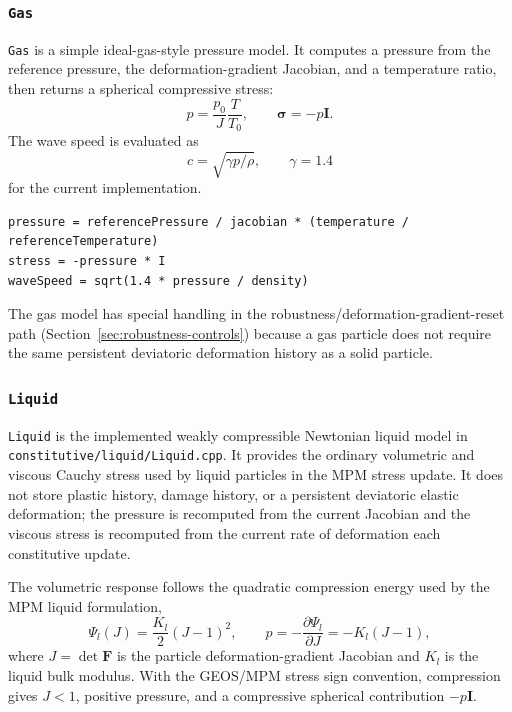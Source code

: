 \subsubsection{\texttt{Gas}}
\label{subsubsec:gas-model}

\texttt{Gas} is a simple ideal-gas-style pressure model.  It computes a pressure from the reference pressure, the deformation-gradient Jacobian, and a temperature ratio, then returns a spherical compressive stress:
\begin{equation}
  p = \frac{p_0}{J}\frac{T}{T_0},
  \qquad
  \boldsymbol{\sigma}=-p\mathbf{I}.
  \label{eq:gas-pressure}
\end{equation}
The wave speed is evaluated as
\begin{equation}
  c = \sqrt{\gamma p/\rho},
  \qquad \gamma=1.4
  \label{eq:gas-wavespeed}
\end{equation}
for the current implementation.

\begin{lstlisting}[caption={Gas stress update.},label={alg:gas-update},basicstyle=\ttfamily\small]
pressure = referencePressure / jacobian * (temperature / referenceTemperature)
stress = -pressure * I
waveSpeed = sqrt(1.4 * pressure / density)
\end{lstlisting}

The gas model has special handling in the robustness/deformation-gradient-reset path (Section~\ref{sec:robustness-controls}) because a gas particle does not require the same persistent deviatoric deformation history as a solid particle.

\subsubsection{\texttt{Liquid}}
\label{subsubsec:liquid-model}

\texttt{Liquid} is the implemented weakly compressible Newtonian liquid model in \texttt{constitutive/liquid/Liquid.cpp}.  It provides the ordinary volumetric and viscous Cauchy stress used by liquid particles in the MPM stress update.  It does not store plastic history, damage history, or a persistent deviatoric elastic deformation; the pressure is recomputed from the current Jacobian and the viscous stress is recomputed from the current rate of deformation each constitutive update.

The volumetric response follows the quadratic compression energy used by the MPM liquid formulation,
\begin{equation}
  \Psi_l(J)=\frac{K_l}{2}\left(J-1\right)^2,
  \qquad
  p=-\frac{\partial \Psi_l}{\partial J}=-K_l\left(J-1\right),
  \label{eq:liquid-pressure-from-energy}
\end{equation}
where \(J=\det\mathbf{F}\) is the particle deformation-gradient Jacobian and \(K_l\) is the liquid bulk modulus.  With the GEOS/MPM stress sign convention, compression gives \(J<1\), positive pressure, and a compressive spherical contribution \(-p\mathbf{I}\).

